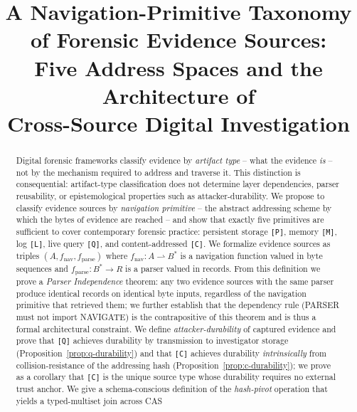 \documentclass[conference]{IEEEtran}
\theoremstyle{definition}
\newcommand{\src}[1]{\texttt{[#1]}}
\begin{document}
\title{A Navigation-Primitive Taxonomy of Forensic Evidence Sources:\\
Five Address Spaces and the Architecture of\\
Cross-Source Digital Investigation}

\author{
}

\maketitle

\begin{abstract}
Digital forensic frameworks classify evidence by \emph{artifact type} -- what
the evidence \emph{is} -- not by the mechanism required to address and
traverse it. This distinction is consequential: artifact-type classification
does not determine layer dependencies, parser reusability, or
epistemological properties such as attacker-durability. We propose to
classify evidence sources by \emph{navigation primitive} -- the abstract
addressing scheme by which the bytes of evidence are reached -- and show
that exactly five primitives are sufficient to cover contemporary forensic
practice: persistent storage \src{P}, memory \src{M}, log \src{L}, live
query \src{Q}, and content-addressed \src{C}. We formalize evidence sources
as triples $(A, f_{\text{nav}}, f_{\text{parse}})$ where $f_{\text{nav}}: A
\rightharpoonup B^{*}$ is a navigation function valued in byte sequences and
$f_{\text{parse}}: B^{*} \to R$ is a parser valued in records. From this
definition we prove a \emph{Parser Independence} theorem: any two evidence
sources with the same parser produce identical records on identical byte
inputs, regardless of the navigation primitive that retrieved them; we
further establish that the dependency rule (PARSER must not import NAVIGATE)
is the contrapositive of this theorem and is thus a formal architectural
constraint. We define \emph{attacker-durability} of captured evidence and
prove that \src{Q} achieves durability by transmission to investigator
storage (Proposition~\ref{prop:q-durability}) and that \src{C} achieves
durability \emph{intrinsically} from collision-resistance of the addressing
hash (Proposition~\ref{prop:c-durability}); we prove as a corollary that
\src{C} is the unique source type whose durability requires no external
trust anchor. We give a schema-conscious definition of the
\emph{hash-pivot} operation that yields a typed-multiset join across CAS

\end{abstract}
\end{document}
